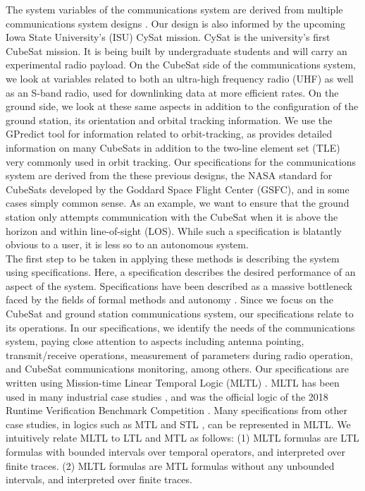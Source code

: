 \documentclass[conf]{new-aiaa}
\begin{document}
The system variables of the communications system are derived from multiple communications system designs \cite{choi2017, Asundi2013}. Our design is also informed by the upcoming Iowa State University's (ISU) CySat mission. CySat is the university's first CubeSat mission. It is being built by undergraduate students and will carry an experimental radio payload. On the CubeSat side of the communications system, we look at variables related to both an ultra-high frequency radio (UHF) as well as an S-band radio, used for downlinking data at more efficient rates. On the ground side, we look at these same aspects in addition to the configuration of the ground station, its orientation and orbital tracking information. We use the GPredict tool for information related to orbit-tracking, as provides detailed information on many CubeSats in addition to the two-line element set (TLE) very commonly used in orbit tracking. Our specifications for the communications system are derived from the these previous designs, the NASA standard for CubeSats developed by the Goddard Space Flight Center (GSFC), and in some cases simply common sense. As an example, we want to ensure that the ground station only attempts communication with the CubeSat when it is above the horizon and within line-of-sight (LOS). While such a specification is blatantly obvious to a user, it is less so to an autonomous system. \\

The first step to be taken in applying these methods is describing the system using specifications. Here, a specification describes the desired performance of an aspect of the system. Specifications have been described as a massive bottleneck faced by the fields of formal methods and autonomy \cite{Roz16}. Since we focus on the CubeSat and ground station communications system, our specifications relate to its operations. In our specifications, we identify the needs of the communications system, paying close attention to aspects including antenna pointing, transmit/receive operations, measurement of parameters during radio operation, and CubeSat communications monitoring, among others. Our specifications are written using Mission-time Linear Temporal Logic (MLTL) \cite{RRS14,LVR19}. MLTL has been used in many industrial case studies \cite{RRS14,GRS14,SRRMMI15,RSI15,SMR15,SMR16,MRS17}, and was the official logic of the 2018 Runtime Verification Benchmark Competition \cite{RVBC2018}. Many specifications from other case studies, in logics such as MTL \cite{AH90} and STL \cite{MN04}, can be represented in MLTL. We intuitively relate MLTL to LTL and MTL as follows: (1) MLTL formulas are LTL formulas with bounded intervals over temporal operators, and interpreted over finite traces. (2) MLTL formulas are MTL formulas without any unbounded intervals, and interpreted over finite traces.\\
\end{document}
